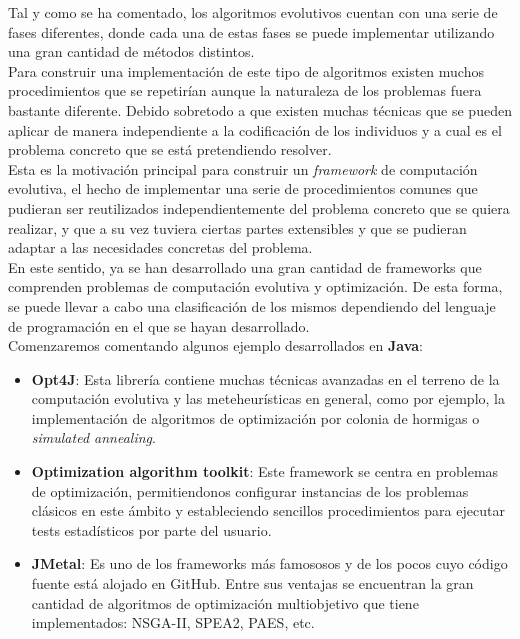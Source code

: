 

Tal y como se ha comentado, los algoritmos evolutivos cuentan con una serie de fases diferentes, donde cada una de estas fases se puede implementar utilizando una gran cantidad de métodos distintos.\\

Para construir una implementación de este tipo de algoritmos existen muchos procedimientos que se repetirían aunque la naturaleza de los problemas fuera bastante diferente. Debido sobretodo a que existen muchas técnicas que se pueden aplicar de manera independiente a la codificación de los individuos y a cual es el problema concreto que se está pretendiendo resolver. \\

Esta es la motivación principal para construir un \textit{framework} de computación evolutiva, el hecho de implementar una serie de procedimientos comunes que pudieran ser reutilizados independientemente del problema concreto que se quiera realizar, y que a su vez tuviera ciertas partes extensibles y que se pudieran adaptar a las necesidades concretas del problema. \\

En este sentido, ya se han desarrollado una gran cantidad de frameworks que comprenden problemas de computación evolutiva y optimización. De esta forma, se puede llevar a cabo una clasificación de los mismos dependiendo del lenguaje de programación en el que se hayan desarrollado. \\

Comenzaremos comentando algunos ejemplo desarrollados en \textbf{Java}:

\begin{itemize}
    \item \textbf{Opt4J}: Esta librería contiene muchas técnicas avanzadas en el terreno de la computación evolutiva y las meteheurísticas en general, como por ejemplo, la implementación de algoritmos de optimización por colonia de hormigas o \textit{simulated annealing}.
    \item \textbf{Optimization algorithm toolkit}: Este framework se centra en problemas de optimización, permitiendonos configurar instancias de los problemas clásicos en este ámbito y estableciendo sencillos procedimientos para ejecutar tests estadísticos por parte del usuario.
    \item \textbf{JMetal}: Es uno de los frameworks más famososos y de los pocos cuyo código fuente está alojado en GitHub. Entre sus ventajas se encuentran la gran cantidad de algoritmos de optimización multiobjetivo que tiene implementados:  NSGA-II, SPEA2, PAES, etc.
\end{itemize}

